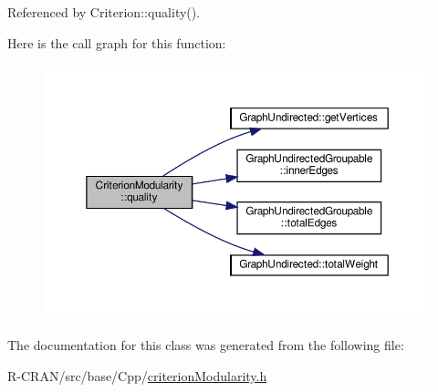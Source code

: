 Referenced by Criterion\+::quality().

Here is the call graph for this function\+:
\nopagebreak
\begin{figure}[H]
\begin{center}
\leavevmode
\includegraphics[width=350pt]{classCriterionModularity_adf9197fd4e5878ca86501447b1fba989_cgraph}
\end{center}
\end{figure}


The documentation for this class was generated from the following file\+:\begin{DoxyCompactItemize}
\item 
R-\/\+C\+R\+A\+N/src/base/\+Cpp/\hyperlink{criterionModularity_8h}{criterion\+Modularity.\+h}\end{DoxyCompactItemize}
